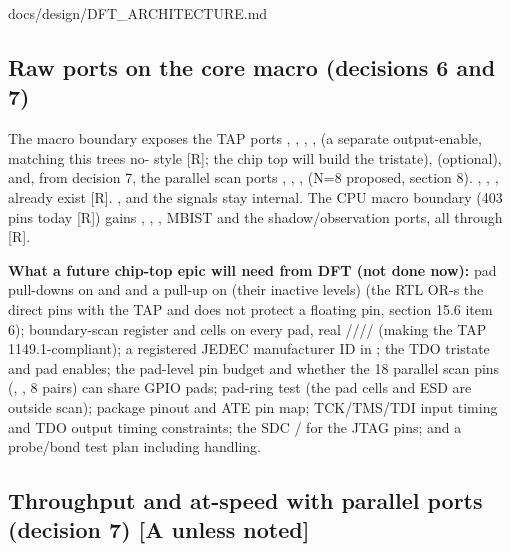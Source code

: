 \begin{relocated}{docs/design/DFT_ARCHITECTURE.md}
\subsection{Raw ports on the core macro (decisions 6 and 7)}\label{tm:ch:dft-architecture:95-raw-ports-on-the-core-macro-decisions-6-and-7}

The macro boundary exposes the TAP ports , ,
, , \textbf{} (a separate
output-enable, matching this tree\textquotesingle s no-
style {[}R{]}; the chip top will build the tristate), 
(optional), and, from decision 7, the parallel scan ports
, , ,
 (N=8 proposed, section 8). ,
, ,  already exist
{[}R{]}. ,  and the 
signals stay internal. The CPU macro boundary (403 pins today {[}R{]})
gains , , ,
MBIST  and the shadow/\allowbreak{}observation
ports, all through  {[}R{]}.

\textbf{What a future chip-top epic will need from DFT (not done now):}
pad pull-downs on  and  and a pull-up
on  (their inactive levels) (the RTL OR-s the direct
pins with the TAP and does not protect a floating pin, section 15.6 item
6); boundary-scan register and cells on every pad, real
////
(making the TAP 1149.1-compliant); a registered JEDEC manufacturer ID in
; the TDO tristate and pad enables; the pad-level pin
budget and whether the 18 parallel scan pins (,
, 8 pairs) can share GPIO pads; pad-ring test (the pad
cells and ESD are outside scan); package pinout and ATE pin map;
TCK/\allowbreak{}TMS/\allowbreak{}TDI input timing and TDO output timing
constraints; the SDC / for
the JTAG pins; and a probe/\allowbreak{}bond test plan including
 handling.

\subsection{Throughput and at-speed with parallel ports (decision 7)
{[}A unless noted{]}}\label{tm:ch:dft-architecture:96-throughput-and-at-speed-with-parallel-ports-decision-7-a-unless-noted}


\end{relocated}
